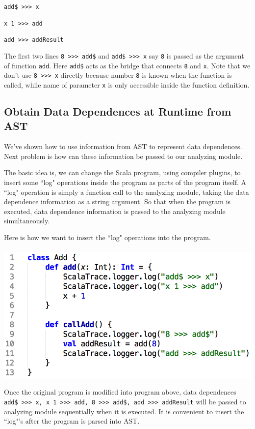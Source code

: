 \documentclass{article}[12pt]
\begin{document}
\texttt{add\$ >>> x}

\texttt{x 1 >>> add}

\texttt{add >>> addResult}

The first two lines \texttt{8 >>> add\$} and \texttt{add\$ >>> x} say \texttt{8} is passed as the argument of function \texttt{add}. Here \texttt{add\$} acts as the bridge that connects \texttt{8} and \texttt{x}. Note that we don't use \texttt{8 >>> x} directly because number \texttt{8} is known when the function is called, while name of parameter \texttt{x} is only accessible inside the function definition. 

\subsection{Obtain Data Dependences at Runtime from AST} 
We've shown how to use information from AST to represent data dependences. Next problem is how can these information be passed to our analyzing module. 

The basic idea is, we can change the Scala program, using compiler plugins, to insert some ``log" operations inside the program as parts of the program itself. A ``log" operation is simply a function call to the analyzing module, taking the data dependence information as a string argument. So that when the program is executed, data dependence information is passed to the analyzing module simultaneously. 

Here is how we want to insert the ``log" operations into the program. 
\\
\\
\includegraphics[scale=0.5]{figures/figure6}

Once the original program is modified into program above, data dependences \texttt{add\$ >>> x, x 1 >>> add, 8 >>> add\$, add >>> addResult} will be passed to analyzing module sequentially when it is executed. It is convenient to insert the ``log"'s after the program is parsed into AST. 
\end{document}
